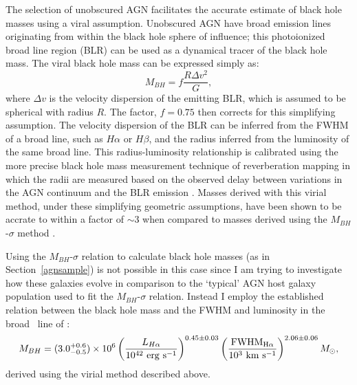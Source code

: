 The selection of unobscured AGN facilitates the accurate estimate of black hole masses using a viral assumption. Unobscured AGN have broad emission lines originating from within the black hole sphere of influence; this photoionized broad line region (BLR) can be used as a dynamical tracer of the black hole mass. The viral black hole mass \citep{peterson14} can be expressed simply as:
\begin{equation}\label{eq:virial}
M_{BH} = f \frac{R\Delta v^2}{G},
\end{equation}
where $\Delta v$ is the velocity dispersion of the emitting BLR, which is assumed to be spherical with radius $R$. The factor, $f = 0.75$ \citep{netzer90} then corrects for this simplifying assumption. The velocity dispersion of the BLR can be inferred from the FWHM of a broad line, such as $H\alpha$ or $H\beta$, and the radius inferred from the luminosity of the same broad line. This radius-luminosity relationship is calibrated using the more precise black hole mass measurement technique of reverberation mapping \citep{blandford82, peterson01, barth15} in which the radii are measured based on the observed delay between variations in the AGN continuum and the BLR emission \citep{kaspi05, bentz06}. Masses derived with this virial method, under these simplifying geometric assumptions, have been shown to be accrate to within a factor of $\sim 3$ when compared to masses derived using the $M_{BH}$-$\sigma$ method \citep[][and see Section~\ref{agnsample}]{ferrarese01, nelson04, onken04}.

Using the $M_{BH}$-$\sigma$ relation to calculate black hole masses (as in Section~\ref{agnsample}) is not possible in this case since I am trying to investigate how these galaxies evolve in comparison to the `typical' AGN host galaxy population used to fit the $M_{BH}$-$\sigma$ relation. Instead I employ the established relation between the black hole mass and the FWHM and luminosity in the broad \ha\ line of \citet{gh07a}: 
\begin{equation}\label{greeneho}
M_{BH} = (3.0^{+0.6}_{-0.5}) \times 10^6 \left ( \frac{L_{H\alpha}}{10^{42} ~\rm{erg}~\rm{s}^{-1}} \right )^{0.45\pm0.03} \left ( \frac{\rm{FWHM}_{H\alpha}}{10^{3}~\rm{km}~\rm{s}^{-1}} \right )^{2.06\pm0.06} M_{\odot},
\end{equation}
derived using the virial method described above. 


